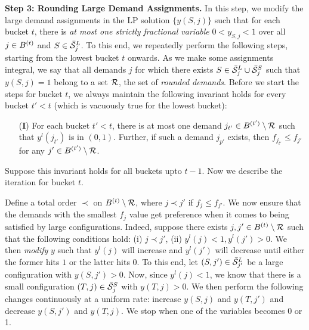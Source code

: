 \medskip \noindent
{\bf Step 3: Rounding Large Demand Assignments.} In this step, we modify the large demand assignments in the LP solution $\{y(S,j)\}$ such that for each bucket $t$, there is \emph{at most one strictly fractional variable} $0 < y_{S,j} < 1$ over all $j \in B^{(t)}$ and $S \in \bar{\cal S}^L_j$. To this end, we repeatedly perform the following steps, starting from the lowest bucket $t$ onwards. As we make some assignments integral, we say that all demands $j$ for which there exists $S \in \bar{\cal S}^L_j \cup \bar{\cal S}^S_j$ such that $y(S,j)=1$ belong to a set ${\cal R}$, the set of \emph{rounded demands}. Before we start the steps for bucket $t$, we always maintain the following invariant holds for every bucket $t' < t$ (which is vacuously true for the lowest bucket):
\begin{framed}
\begin{itemize}
\item[({\bf I})] For each bucket $t' < t$, there is at most one  demand $j_{t'} \in B^{(t')} \setminus {\cal R}$ such that $y^l(j_{t'})$ is in $(0,1)$. Further, if such a demand $j_{p'}$ exists, then $f_{j_{t'}} \leq f_{j'}$ for any $j' \in B^{(t')} \setminus {\cal R}$.
\end{itemize}
\end{framed}

Suppose this invariant holds for all buckets upto $t-1$. Now we describe the iteration for bucket $t$.

\medskip {}  Define a total order $\prec$ on $B^{(t)} \setminus {\cal R}$, where $j \prec j'$ if $f_{j} \leq f_{j'}$.  We now ensure that the demands with the smallest $f_j$ value get preference when it comes to being satisfied by large configurations. Indeed, suppose there exists $j,j' \in B^{(t)} \setminus {\cal R}$ such that the following conditions hold: (i) $j \prec j'$, (ii) $y^l(j) < 1, y^l(j') > 0$. We then \emph{modify} $y$ such that
$y^l(j)$ will increase and $y^l(j')$ will decrease until either the former hits $1$ or the latter hits $0$. To this end, let $(S,j') \in \bar{\cal S}^L_{j'}$ be a large configuration  with $y(S,j') > 0$. Now, since $y^l(j) < 1$, we know that there is a small configuration $(T,j) \in \bar{\cal S}^S_j$ with $y(T,j) > 0$. We then perform the following changes continuously at a uniform rate: increase $y(S,j)$ and $y(T,j')$ and decrease $y(S,j')$ and $y(T,j)$. We stop when one of the variables becomes 0 or 1.

